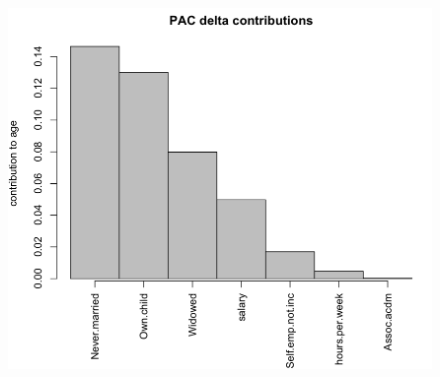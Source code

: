 \documentclass{beamer}
\begin{document}
\begin{frame}

\begin{figure}
\includegraphics[scale=0.3]{figures/ageContrib.png}
\caption{}
 \label{fig:ageContrib}
\end{figure}

\end{frame}



\begin{frame}
\frametitle{}
\end{frame}

\begin{frame}
\frametitle{}
\end{frame}

\begin{frame}
\frametitle{}
\end{frame}

\begin{frame}
\frametitle{}
\end{frame}

\begin{frame}
\frametitle{}
\end{frame}

\end{document}

